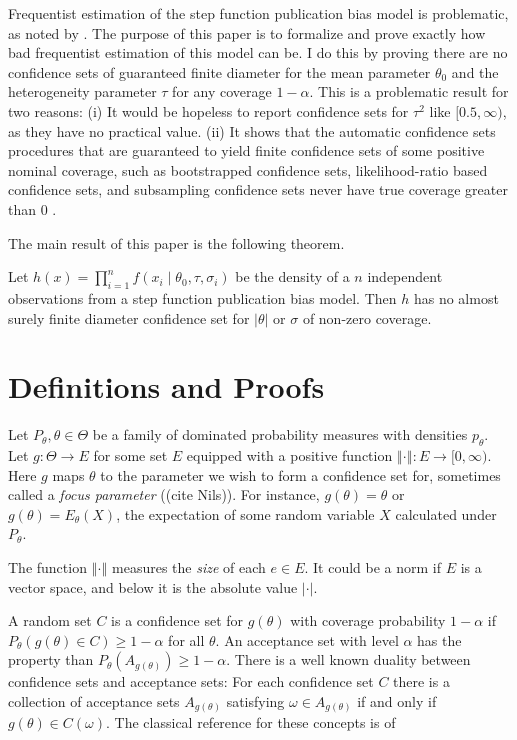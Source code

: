 \documentclass[twoside]{article}
\begin{document}
Frequentist estimation of the step function publication bias model
is problematic, as noted by \citet[Appendix, 1]{mcshane2016adjusting}.
The purpose of this paper is to formalize and prove exactly how bad frequentist estimation of this model can be. I do this by proving there are no confidence sets of guaranteed finite diameter for the mean parameter $\theta_{0}$
and the heterogeneity parameter $\tau$ for any coverage $1-\alpha$.
This is a problematic result for two reasons: (i) It would be hopeless
to report confidence sets for $\tau^{2}$ like $[0.5,\infty)$,
as they have no practical value. (ii) It shows that the automatic confidence
sets procedures that are guaranteed to yield finite confidence sets
of some positive nominal coverage, such as bootstrapped confidence
sets, likelihood-ratio based confidence sets, and subsampling confidence
sets never have true coverage greater than $0$ \citep[see][]{gleser996bootstrap}.

The main result of this paper is the following theorem.
\begin{thm}
\label{prop:p-hacking infinite confidence interval}Let $h(x)=\prod_{i=1}^{n}f(x_{i}\mid\theta_{0},\tau,\sigma_{i})$
be the density of a $n$ independent observations from a step function
publication bias model. Then $h$ has no almost surely finite diameter
confidence set for $\left|\theta\right|$ or $\sigma$ of non-zero
coverage.
\end{thm}

\section{Definitions and Proofs}
Let $P_{\theta},\theta\in\Theta$ be a family of dominated probability
measures with densities $p_{\theta}$. Let $g:\Theta\to E$ for some
set $E$ equipped with a positive function $\left\Vert \cdot\right\Vert :E\to[0,\infty)$.
Here $g$ maps $\theta$ to the parameter we wish to form a confidence
set for, sometimes called a \textit{focus parameter} ((cite Nils)). For instance, $g(\theta) = \theta$ or $g(\theta) = E_\theta(X)$, the expectation of some random variable $X$ calculated under $P_\theta$. 

The function $\left\Vert \cdot\right\Vert$ measures the \textit{size} of each $e \in E$. It could be a norm if $E$ is a vector space, and below it is the
absolute value $\left|\cdot\right|$. 

A random set $C$ is a confidence set for $g(\theta)$ with coverage probability $1-\alpha$
if $P_{\theta}(g(\theta)\in C)\geq1-\alpha$
for all $\theta$. An\emph{ }acceptance set with level $\alpha$ has
the property than $P_{\theta}(A_{g(\theta)})\geq1-\alpha$.
There is a well known duality between confidence sets and acceptance
sets: For each confidence set $C$ there is a collection of acceptance
sets $A_{g(\theta)}$ satisfying $\omega\in A_{g(\theta)}$ if and only if $g(\theta)\in C(\omega)$. The classical reference for these concepts is of \citet[chapter 3.5]{lehmann2006testing}
\end{document}
